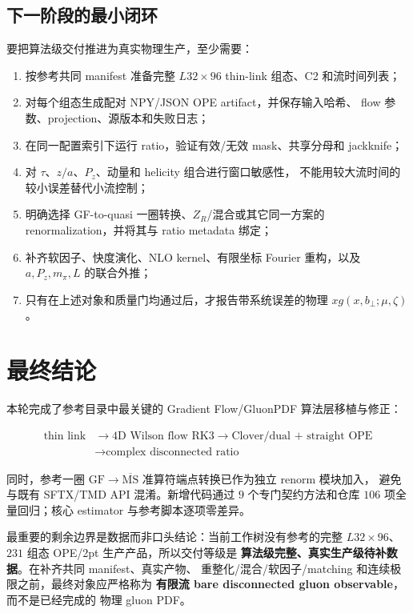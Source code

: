 \documentclass[UTF8,a4paper,11pt]{ctexart}
\newcommand{\code}[1]{\texttt{\detokenize{#1}}}
\newcommand{\MSbar}{\overline{\mathrm{MS}}}
\newcommand{\GF}{\mathrm{GF}}
\begin{document}
\subsection{下一阶段的最小闭环}

要把算法级交付推进为真实物理生产，至少需要：

\begin{enumerate}
  \item 按参考共同 manifest 准备完整 $L32\times96$ thin-link 组态、C2
        \code{nopol/pol35} 和流时间列表；
  \item 对每个组态生成配对 NPY/JSON OPE artifact，并保存输入哈希、
        flow 参数、projection、源版本和失败日志；
  \item 在同一配置索引下运行 ratio，验证有效/无效 mask、共享分母和
        jackknife；
  \item 对 $\tau$、$z/a$、$P_z$、动量和 helicity 组合进行窗口敏感性，
        不能用较大流时间的较小误差替代小流控制；
  \item 明确选择 GF-to-quasi 一圈转换、$Z_R$/混合或其它同一方案的
        renormalization，并将其与 ratio metadata 绑定；
  \item 补齐软因子、快度演化、NLO kernel、有限坐标 Fourier 重构，以及
        $a,P_z,m_\pi,L$ 的联合外推；
  \item 只有在上述对象和质量门均通过后，才报告带系统误差的物理
        $xg(x,b_\perp;\mu,\zeta)$。
\end{enumerate}

\section{最终结论}

本轮完成了参考目录中最关键的 Gradient Flow/GluonPDF 算法层移植与修正：

\begin{equation}
\boxed{\begin{aligned}
\text{thin link}
&\longrightarrow\text{4D Wilson flow RK3}
 \longrightarrow\text{Clover/dual + straight OPE}\\
&\longrightarrow\text{complex disconnected ratio}
\end{aligned}}
\end{equation}

同时，参考一圈 $\GF\to\MSbar$ 准算符端点转换已作为独立 renorm 模块加入，
避免与既有 SFTX/TMD API 混淆。新增代码通过 $9$ 个专门契约方法和仓库
$106$ 项全量回归；核心 estimator 与参考脚本逐项零差异。

最重要的剩余边界是数据而非口头结论：当前工作树没有参考的完整
$L32\times96$、$231$ 组态 OPE/2pt 生产产品，所以交付等级是
\textbf{算法级完整、真实生产级待补数据}。在补齐共同 manifest、真实产物、
重整化/混合/软因子/matching 和连续极限之前，最终对象应严格称为
\textbf{有限流 bare disconnected gluon observable}，而不是已经完成的
物理 gluon PDF。
\end{document}
